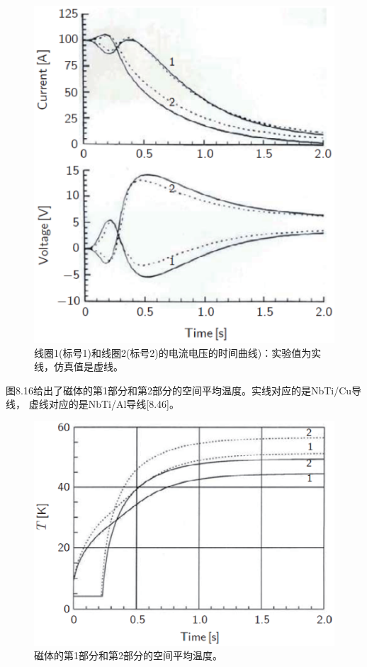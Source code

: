 \begin{figure}
	\centering
	\includegraphics[scale=0.5]{chpt8/figs/fig8.15.eps}
	\caption{线圈1(标号1)和线圈2(标号2)的电流电压的时间曲线)：实验值为实线，仿真值是虚线。 }
\end{figure}

图8.16给出了磁体的第1部分和第2部分的空间平均温度。实线对应的是NbTi/Cu导线，
虚线对应的是NbTi/Al导线[8.46]。

\begin{figure}
	\centering
	\includegraphics[scale=0.6]{chpt8/figs/fig8.16.eps}
	\caption{磁体的第1部分和第2部分的空间平均温度。}
\end{figure}



